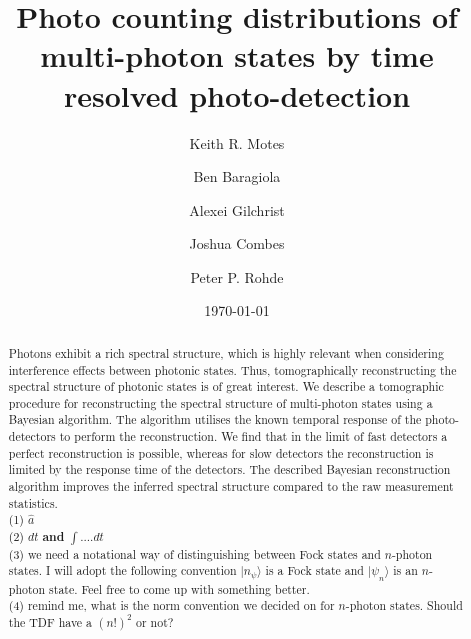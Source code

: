 \documentclass[aps,pra,twocolumn,amsmath,amssymb,color,superscriptaddress]{revtex4}
\newcommand{\ket}[1]{|#1\rangle}
\newcommand{\blue}{\color{blue}}
\begin{document}


%
%

\title{Photo counting distributions of multi-photon states by time resolved photo-detection}

\author{Keith R. Motes}

\author{Ben Baragiola}

\author{Alexei Gilchrist}

\author{\blue Joshua Combes}

\author{Peter P. Rohde}

\date{\today}

\frenchspacing

%
%

\begin{abstract}
Photons exhibit a rich spectral structure, which is highly relevant when considering interference effects between photonic states. Thus, tomographically reconstructing the spectral structure of photonic states is of great interest. We describe a tomographic procedure for reconstructing the spectral structure of multi-photon states using a Bayesian algorithm. The algorithm utilises the known temporal response of the photo-detectors to perform the reconstruction. We find that in the limit of fast detectors a perfect reconstruction is possible, whereas for slow detectors the reconstruction is limited by the response time of the detectors. The described Bayesian reconstruction algorithm improves the inferred spectral structure compared to the raw measurement statistics.\\
{\blue (1)  $\hat a$\\ 
(2) $dt$ {\bf and} $\int .... dt$ \\ 
(3) we need a notational way of distinguishing between Fock states and $n$-photon states. I will adopt the following convention $\ket{n_\psi}$ is a Fock state and $\ket{\psi_n}$ is an $n$-photon state. Feel free to come up with something better.\\ (4) remind me, what is the norm convention we decided on for $n$-photon states. Should the TDF have a $(n!)^2$ or not? }
\end{abstract}
\end{document}
